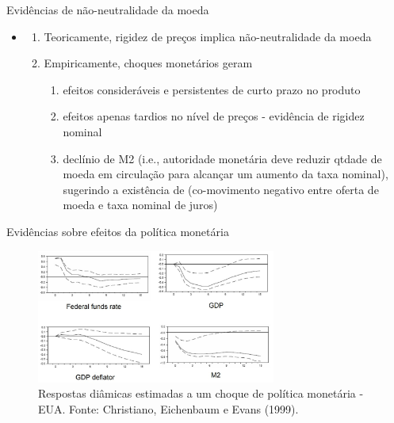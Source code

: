 \documentclass[10pt]{beamer}
\begin{document}
\begin{frame}
    {Evidências de não-neutralidade da moeda}
    \begin{itemize}
        \item {}\bigskip
        \begin{enumerate}
            \item Teoricamente, rigidez de preços implica não-neutralidade da moeda\bigskip
            \item Empiricamente, choques monetários geram\medskip
            \begin{enumerate}
                \item efeitos consideráveis e persistentes de curto prazo no produto\medskip
                \item efeitos apenas tardios no nível de preços - evidência de rigidez nominal\medskip
                \item declínio de M2 (i.e., autoridade monetária deve reduzir qtdade de moeda em circulação para alcançar um aumento da taxa nominal), sugerindo a existência de  (co-movimento negativo entre oferta de moeda e taxa nominal de juros)
            \end{enumerate}
        \end{enumerate}
    \end{itemize}
\end{frame}

\begin{frame}
    {Evidências sobre efeitos da política monetária}
    \begin{figure}
        \centering
        \includegraphics[width=0.7\textwidth]{./figures/aula3_fig5.jpg}
        \caption{Respostas diâmicas estimadas a um choque de política monetária - EUA. Fonte: Christiano, Eichenbaum e Evans (1999).}
        \label{aula3_fig5}
    \end{figure}
\end{frame}
\end{document}
